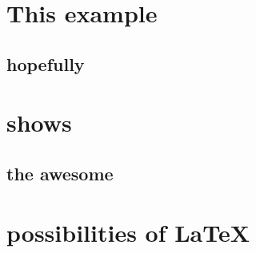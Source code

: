\tableofcontents

\section{This example}

\subsection{hopefully}

\section{shows}

\subsection{the awesome}

\section{possibilities of {\LaTeX}}
